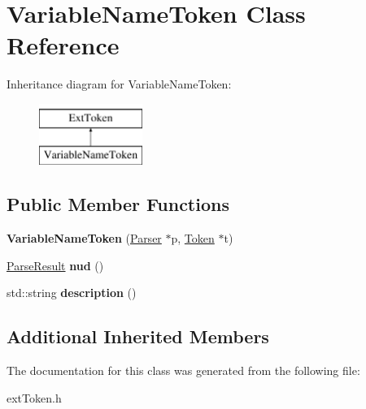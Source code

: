 \hypertarget{classVariableNameToken}{\section{Variable\-Name\-Token Class Reference}
\label{classVariableNameToken}
}
Inheritance diagram for Variable\-Name\-Token\-:\begin{figure}[H]
\begin{center}
\leavevmode
\includegraphics[height=2.000000cm]{classVariableNameToken}
\end{center}
\end{figure}
\subsection*{Public Member Functions}
\begin{DoxyCompactItemize}
\item 
\hypertarget{classVariableNameToken_a804403db425122d1c8d40fd2c6172439}{{\bfseries Variable\-Name\-Token} (\hyperlink{classParser}{Parser} $\ast$p, \hyperlink{classToken}{Token} $\ast$t)}\label{classVariableNameToken_a804403db425122d1c8d40fd2c6172439}

\item 
\hypertarget{classVariableNameToken_a6e775ad5b8c2eafd2e2a185ab90b1f27}{\hyperlink{classParseResult}{Parse\-Result} {\bfseries nud} ()}\label{classVariableNameToken_a6e775ad5b8c2eafd2e2a185ab90b1f27}

\item 
\hypertarget{classVariableNameToken_a54bc3a78736e5c967dc4b1c58e66135b}{std\-::string {\bfseries description} ()}\label{classVariableNameToken_a54bc3a78736e5c967dc4b1c58e66135b}

\end{DoxyCompactItemize}
\subsection*{Additional Inherited Members}


The documentation for this class was generated from the following file\-:\begin{DoxyCompactItemize}
\item 
ext\-Token.\-h\end{DoxyCompactItemize}
